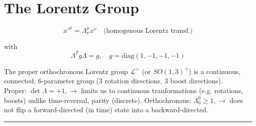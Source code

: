 \documentclass[11pt]{article}
\author{}%
\title{}
\date{} %
\newcommand{\lag}{\mathcal{L}}
\begin{document}
	\maketitle
	\vspace{-9em}

	\noindent
	
	\vspace{11pt}
	
	\section*{The Lorentz Group}
	
	\[ x'^{\mu} = \Lambda^\mu_\nu x^\nu \quad \text{(homogenous Lorentz transf.)}\]

with \[ \Lambda^T g \Lambda = g, \quad g = \text{diag}(1, -1, -1, -1)	\]
	
	The proper orthochronous Lorentz group $\lag^+$ (or $SO(1,3)^+$) is a continuous, connected, 6-parameter group (3 rotation directions, 3 boost directions).\\
	Proper: $\det \Lambda = + 1, \rightarrow$ limits us to continuous tranformations (e.g. rotations, boosts) unlike time-reversal, parity (discrete). Orthochronous: $\Lambda^0_0 \geq 1, \rightarrow$ does not flip a forward-directed (in time) state into a backward-directed. \\
	
\vspace{-11pt}
	{\hfill \color{VioletRed} \rule{0.5\textwidth}{0.4pt} \hfill }\\
	
\end{document}
